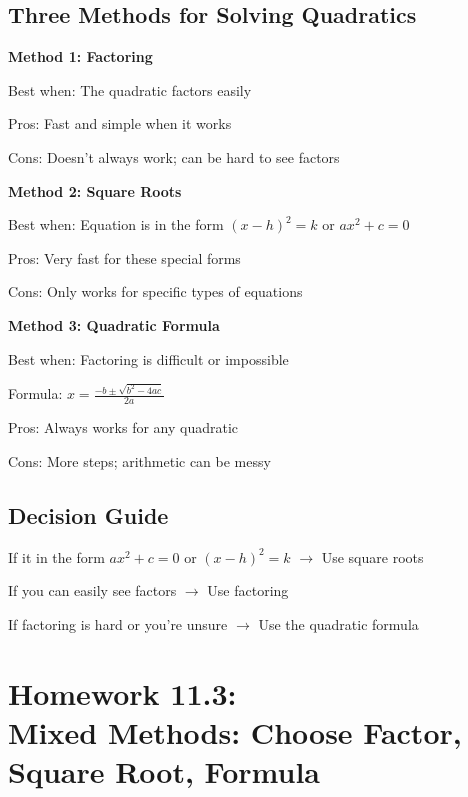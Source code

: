 \documentclass[12pt]{article}
\begin{document}
		\subsection*{Three Methods for Solving Quadratics}

			\textbf{Method 1: Factoring}

			Best when: The quadratic factors easily

			Pros: Fast and simple when it works

			Cons: Doesn't always work; can be hard to see factors

			\vspace{0.5cm}

			\textbf{Method 2: Square Roots}

			Best when: Equation is in the form $(x - h)^2 = k$ or $ax^2 + c = 0$

			Pros: Very fast for these special forms

			Cons: Only works for specific types of equations

			\vspace{0.5cm}

			\textbf{Method 3: Quadratic Formula}

			Best when: Factoring is difficult or impossible

			Formula: $x = \frac{-b \pm \sqrt{b^2 - 4ac}}{2a}$

			Pros: Always works for any quadratic

			Cons: More steps; arithmetic can be messy
            
            \vspace{0.5cm}

		\subsection*{Decision Guide}

			If it in the form $ax^2 + c = 0$ or $(x - h)^2 = k$
			$\rightarrow$ Use square roots

			\vspace{0.5cm}

			If you can easily see factors
            $\rightarrow$ Use factoring

			\vspace{0.5cm}

			If factoring is hard or you're unsure
			$\rightarrow$ Use the quadratic formula

		\newpage

	\section*{Homework 11.3: \\ Mixed Methods: Choose Factor, Square Root, Formula}
\end{document}
